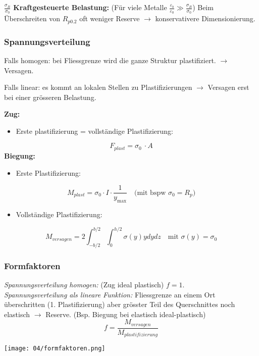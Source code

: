             $\frac{\sigma_B}{\sigma_0}$ \textbf{Kraftgesteuerte Belastung:} (Für viele Metalle $\frac{\varepsilon_b}{\varepsilon_0} \gg \frac{\sigma_B}{\sigma_0}$) Beim Überschreiten von $R_{p0.2}$ oft weniger Reserve $\rightarrow$ konservativere Dimensionierung.
        
        \subsubsection{Spannungsverteilung}
            Falls homogen: bei Fliessgrenze wird die ganze Struktur plastifiziert. $\rightarrow$ Versagen. 
              
            Falls linear: es kommt an lokalen Stellen zu Plastifizierungen $\rightarrow$ Versagen erst bei einer grösseren Belastung.
            
            \textbf{Zug:}
            \begin{itemize}
                \item Erste plastifizierung = vollständige Plastifizierung:
            \end{itemize}
            \[F_{plast} = \sigma_0\ \cdot A\]
            \textbf{Biegung:}
            \begin{itemize}
                \item Erste Plastifizierung:
            \end{itemize}
            \[M_{plast} = \sigma_0\cdot I\cdot\frac{1}{y_{\textrm{max}}} \quad\textrm{(mit bspw $\sigma_0 = R_p$)}\]
            \begin{itemize}
                \item Vollständige Plastifizierung:
            \end{itemize}
            \[M_{versagen} = 2\int_{-b/2}^{b/2}\int_{0}^{h/2}\sigma(y)ydydz \quad\textrm{mit $\sigma(y) = \sigma_0$}\]
            
        \subsubsection{Formfaktoren}
            \textit{Spannungsverteilung homogen:} (Zug ideal plastisch) $f=1$.
            \\\textit{Spannungsverteilung als lineare Funktion:} Fliessgrenze an einem Ort überschritten (1. Plastifizierung) aber grösster Teil des Querschnittes noch elastisch $\rightarrow$ Reserve. (Bsp. Biegung bei elastisch ideal-plastisch)
            \[\boxed{f=\frac{M_{versagen}}{M_{plastifizierung}}}\]
            \begin{center}
                \texttt{[image: 04/formfaktoren.png]}
            \end{center}
    
            